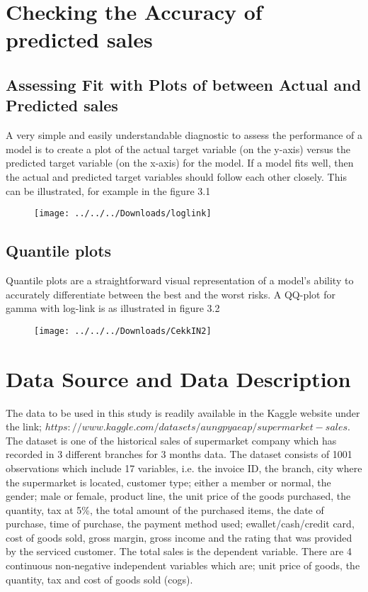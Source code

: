 \section{Checking the Accuracy of predicted sales}
\subsection{Assessing Fit with Plots of between Actual and Predicted sales}

A very simple and easily understandable diagnostic to assess the performance of a model is to create a plot of the actual target variable (on the y-axis) versus the predicted target variable (on the x-axis) for the model. If a model fits well, then the actual and predicted target variables should follow each other closely.
This can be illustrated, for example in the figure 3.1
\begin{figure}[H]
	\centering
	\texttt{[image: ../../../Downloads/loglink]}
	\caption{}
	\label{fig:loglink}
\end{figure}
\subsection{Quantile plots}

Quantile plots are a straightforward visual representation of a model’s ability to accurately differentiate between the best and the worst risks.
A QQ-plot for gamma with log-link is as illustrated in figure 3.2
\begin{figure}[H]
	\centering
	\texttt{[image: ../../../Downloads/CekkIN2]}
	\caption{}
	\label{fig:cekkin2}
\end{figure}
\section{Data Source and Data Description}
The data to be used in this study is readily available in the Kaggle website under the link; $https://www.kaggle.com/datasets/aungpyaeap/supermarket-sales$. The dataset is one of the historical sales of supermarket company which has recorded in 3 different branches for 3 months data. The dataset consists of 1001 observations which include 17 variables, i.e. the invoice ID, the branch, city where the supermarket is located, customer type; either a member or normal, the gender; male or female, product line, the unit price of the goods purchased, the quantity, tax at 5\%, the total amount of the purchased items, the date of purchase, time of purchase, the payment method used; ewallet/cash/credit card, cost of goods sold, gross margin, gross income and the rating that was provided by the serviced customer. The total sales is the dependent variable. There are 4 continuous non-negative independent variables which are; unit price of goods, the quantity, tax and cost of goods sold (cogs).